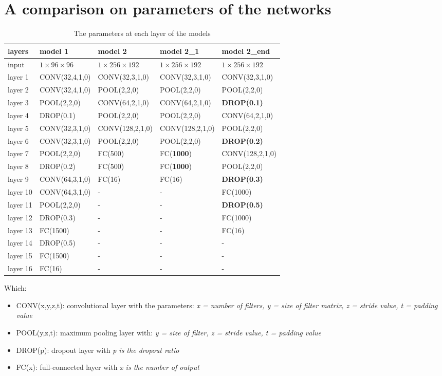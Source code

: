 \documentclass[12pt,a4paper]{article}
\begin{document}
\section*{A comparison on parameters of the networks}
\begin{table}[h!]
	\centering
	\begin{tabular}{l p{3cm} p{3cm} p{3cm} p{3cm}}
		layers & model 1 & model 2 & model 2\_1 & model 2\_end \\ \hline
		input & $ 1 \times 96 \times 96$ & $1 \times 256 \times 192$ & $1 \times 256 \times 192$ & $1 \times 256 \times 192$ \\ \hline
 		layer 1 & CONV(32,4,1,0) & CONV(32,3,1,0) & CONV(32,3,1,0) & CONV(32,3,1,0) \\ \hline
		layer 2 & CONV(32,4,1,0) & POOL(2,2,0) & POOL(2,2,0) & POOL(2,2,0) \\ \hline
		layer 3 & POOL(2,2,0) & CONV(64,2,1,0) & CONV(64,2,1,0) & \textbf{DROP(0.1)} \\ \hline
		layer 4 & DROP(0.1) & POOL(2,2,0) & POOL(2,2,0) & CONV(64,2,1,0) \\ \hline
		layer 5 & CONV(32,3,1,0) & CONV(128,2,1,0) & CONV(128,2,1,0) & POOL(2,2,0) \\ \hline
		layer 6 & CONV(32,3,1,0) & POOL(2,2,0) & POOL(2,2,0) & \textbf{DROP(0.2)} \\ \hline
		layer 7 & POOL(2,2,0)  & FC(500) & FC(\textbf{1000}) & CONV(128,2,1,0) \\ \hline
		layer 8 & DROP(0.2) & FC(500) & FC(\textbf{1000}) & POOL(2,2,0) \\ \hline
		layer 9 & CONV(64,3,1,0)  & FC(16) & FC(16) & \textbf{DROP(0.3)} \\ \hline
		layer 10 & CONV(64,3,1,0)  & - & - & FC(1000) \\ \hline
		layer 11 & POOL(2,2,0) & - & - & \textbf{DROP(0.5)} \\ \hline
		layer 12 & DROP(0.3) & - & - & FC(1000) \\ \hline
		layer 13 & FC(1500) & - & - & FC(16) \\ \hline
		layer 14 & DROP(0.5) & - & - & - \\ \hline
		layer 15 & FC(1500) & - & - & - \\ \hline
		layer 16 & FC(16) & - & - & - \\ \hline
	\end{tabular}
	\caption{The parameters at each layer of the models}
	\label{modelparameters}
\end{table}
Which:
\begin{itemize}
	\item CONV(x,y,z,t): convolutional layer with the parameters: \textit{x = number of filters, y = size of filter matrix, z = stride value, t = padding value}
	\item POOL(y,z,t): maximum pooling layer with: \textit{y = size of filter, z = stride value, t = padding value}
	\item DROP(p): dropout layer with \textit{p is the dropout ratio}
	\item FC(x): full-connected layer with \textit{x is the number of output}
\end{itemize}
\end{document}
